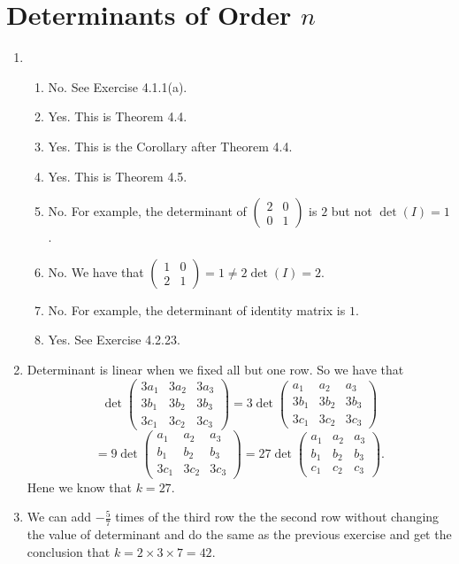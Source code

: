 \section{Determinants of Order $n$}
\begin{enumerate}
\item \begin{enumerate}
\item No. See Exercise 4.1.1(a).
\item Yes. This is Theorem 4.4.
\item Yes. This is the Corollary after Theorem 4.4.
\item Yes. This is Theorem 4.5.
\item No. For example, the determinant of $\begin{pmatrix}2&0\\0&1\end{pmatrix}$ is $2$ but not $\det(I)=1$.
\item No. We have that $\begin{pmatrix}1&0\\2&1\end{pmatrix}=1\neq 2\det(I)=2$. 
\item No. For example, the determinant of identity matrix is $1$.
\item Yes. See Exercise 4.2.23.
\end{enumerate}
\item Determinant is linear when we fixed all but one row. So we have that 
\[\det\begin{pmatrix}3a_1&3a_2&3a_3\\3b_1&3b_2&3b_3\\3c_1&3c_2&3c_3\end{pmatrix}=3\det\begin{pmatrix}a_1&a_2&a_3\\3b_1&3b_2&3b_3\\3c_1&3c_2&3c_3\end{pmatrix}\]
\[=9\det\begin{pmatrix}a_1&a_2&a_3\\b_1&b_2&b_3\\3c_1&3c_2&3c_3\end{pmatrix}=27\det\begin{pmatrix}a_1&a_2&a_3\\b_1&b_2&b_3\\c_1&c_2&c_3\end{pmatrix}.\]
Hene we know that $k=27$.
\item We can add $-\frac{5}{7}$ times  of the third row the the second row without changing the value of determinant and do the same as the previous exercise and get the conclusion that $k=2\times 3\times 7=42$.

\end{enumerate}
